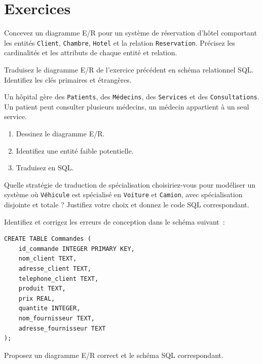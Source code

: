 \section*{Exercices}

\begin{exercice}
Concevez un diagramme E/R pour un syst\`eme de r\'eservation d'h\^otel
comportant les entit\'es \texttt{Client}, \texttt{Chambre}, \texttt{Hotel}
et la relation \texttt{Reservation}. Pr\'ecisez les cardinalit\'es et
les attributs de chaque entit\'e et relation.
\end{exercice}

\begin{exercice}
Traduisez le diagramme E/R de l'exercice pr\'ec\'edent en sch\'ema relationnel SQL.
Identifiez les cl\'es primaires et \'etrang\`eres.
\end{exercice}

\begin{exercice}
Un h\^opital g\`ere des \texttt{Patients}, des \texttt{M\'edecins}, des
\texttt{Services} et des \texttt{Consultations}. Un patient peut consulter
plusieurs m\'edecins, un m\'edecin appartient \`a un seul service.
\begin{enumerate}
    \item Dessinez le diagramme E/R.
    \item Identifiez une entit\'e faible potentielle.
    \item Traduisez en SQL.
\end{enumerate}
\end{exercice}

\begin{exercice}
Quelle strat\'egie de traduction de sp\'ecialisation choisiriez-vous pour
mod\'eliser un syst\`eme o\`u \texttt{V\'ehicule} est sp\'ecialis\'e en
\texttt{Voiture} et \texttt{Camion}, avec sp\'ecialisation disjointe et totale ?
Justifiez votre choix et donnez le code SQL correspondant.
\end{exercice}

\begin{exercice}
Identifiez et corrigez les erreurs de conception dans le sch\'ema suivant~:
\begin{verbatim}
CREATE TABLE Commandes (
    id_commande INTEGER PRIMARY KEY,
    nom_client TEXT,
    adresse_client TEXT,
    telephone_client TEXT,
    produit TEXT,
    prix REAL,
    quantite INTEGER,
    nom_fournisseur TEXT,
    adresse_fournisseur TEXT
);
\end{verbatim}
Proposez un diagramme E/R correct et le sch\'ema SQL correspondant.
\end{exercice}
